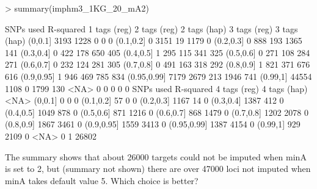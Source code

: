 \begin{Schunk}
\begin{Sinput}
> summary(imphm3_1KG_20_mA2)
\end{Sinput}
\begin{Soutput}
             SNPs used
R-squared     1 tags (reg) 2 tags (reg) 2 tags (hap) 3 tags (reg) 3 tags (hap)
  (0,0.1]             3193         1228            0            0            0
  (0.1,0.2]              0         3151           19         1179            0
  (0.2,0.3]              0          888          193         1365          141
  (0.3,0.4]              0          422          178          650          405
  (0.4,0.5]              1          295          115          341          325
  (0.5,0.6]              0          271          108          284          271
  (0.6,0.7]              0          232          124          281          305
  (0.7,0.8]              0          491          163          318          292
  (0.8,0.9]              1          821          371          676          616
  (0.9,0.95]             1          946          469          785          834
  (0.95,0.99]         7179         2679          213         1946          741
  (0.99,1]           44554         1108            0         1799          130
  <NA>                   0            0            0            0            0
             SNPs used
R-squared     4 tags (reg) 4 tags (hap)  <NA>
  (0,0.1]                0            0     0
  (0.1,0.2]             57            0     0
  (0.2,0.3]           1167           14     0
  (0.3,0.4]           1387          412     0
  (0.4,0.5]           1049          878     0
  (0.5,0.6]            871         1216     0
  (0.6,0.7]            868         1479     0
  (0.7,0.8]           1202         2078     0
  (0.8,0.9]           1867         3461     0
  (0.9,0.95]          1559         3413     0
  (0.95,0.99]         1387         4154     0
  (0.99,1]             929         2109     0
  <NA>                   0            1 26802
\end{Soutput}
\end{Schunk}
The summary shows that about 26000 targets could not be imputed when minA is set to 2, but (summary not
shown) there are over 47000 loci not
imputed when minA takes default value 5.  Which choice is better?

